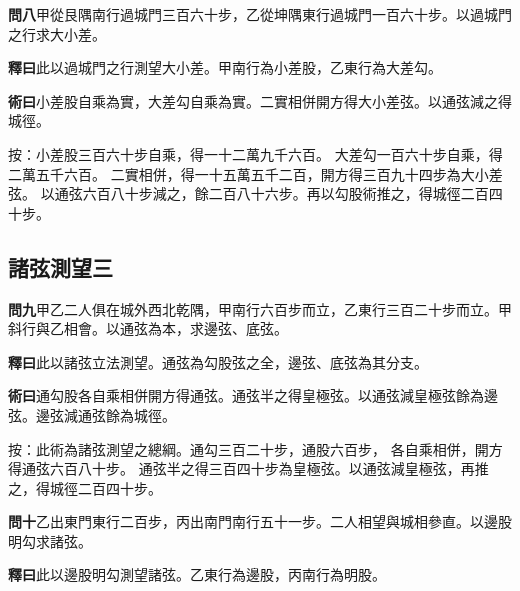 \documentclass[12pt,a4paper]{article}
\newcommand{\Section}[1]{\subsection*{#1}}
\begin{document}
\noindent\textbf{問八}\quad 甲從艮隅南行過城門三百六十步，乙從坤隅東行過城門一百六十步。以過城門之行求大小差。

\vspace{0.3em}

\noindent\textbf{釋曰}\quad 此以過城門之行測望大小差。甲南行為小差股，乙東行為大差勾。

\vspace{0.3em}

\noindent\textbf{術曰}\quad 小差股自乘為實，大差勾自乘為實。二實相併開方得大小差弦。以通弦減之得城徑。

\vspace{0.3em}

\noindent
按：小差股三百六十步自乘，得一十二萬九千六百。
大差勾一百六十步自乘，得二萬五千六百。
二實相併，得一十五萬五千二百，開方得三百九十四步為大小差弦。
以通弦六百八十步減之，餘二百八十六步。再以勾股術推之，得城徑二百四十步。

\Section{諸弦測望三}

\noindent\textbf{問九}\quad 甲乙二人俱在城外西北乾隅，甲南行六百步而立，乙東行三百二十步而立。甲斜行與乙相會。以通弦為本，求邊弦、底弦。

\vspace{0.3em}

\noindent\textbf{釋曰}\quad 此以諸弦立法測望。通弦為勾股弦之全，邊弦、底弦為其分支。

\vspace{0.3em}

\noindent\textbf{術曰}\quad 通勾股各自乘相併開方得通弦。通弦半之得皇極弦。以通弦減皇極弦餘為邊弦。邊弦減通弦餘為城徑。

\vspace{0.3em}

\noindent
按：此術為諸弦測望之總綱。通勾三百二十步，通股六百步，
各自乘相併，開方得通弦六百八十步。
通弦半之得三百四十步為皇極弦。以通弦減皇極弦，再推之，得城徑二百四十步。

\vspace{0.5em}

\noindent\textbf{問十}\quad 乙出東門東行二百步，丙出南門南行五十一步。二人相望與城相參直。以邊股明勾求諸弦。

\vspace{0.3em}

\noindent\textbf{釋曰}\quad 此以邊股明勾測望諸弦。乙東行為邊股，丙南行為明股。
\end{document}
